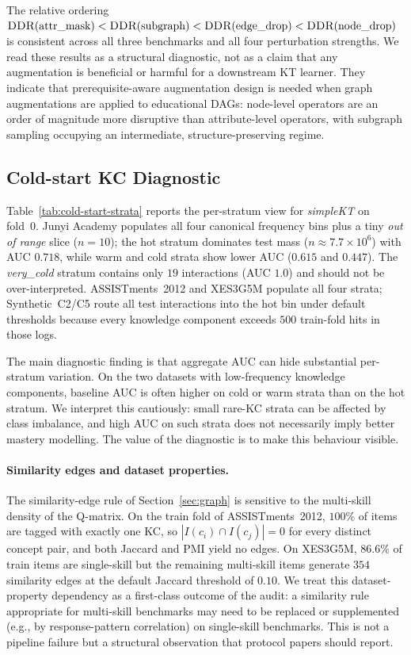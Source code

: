 \documentclass[runningheads]{llncs}
\newcommand{\KC}{knowledge component}
\newcommand{\KCs}{knowledge components}
\newcommand{\DDR}{\textsc{DDR}}
\begin{document}
The relative ordering
$\DDR(\text{attr\_mask}) < \DDR(\text{subgraph}) <
\DDR(\text{edge\_drop}) < \DDR(\text{node\_drop})$
is consistent across all three benchmarks and all four perturbation
strengths. We read these results as a structural diagnostic, not as a
claim that any augmentation is beneficial or harmful for a downstream
KT learner. They indicate that prerequisite-aware augmentation design
is needed when graph augmentations are applied to educational DAGs:
node-level operators are an order of magnitude more disruptive than
attribute-level operators, with subgraph sampling occupying an
intermediate, structure-preserving regime.
\subsection{Cold-start KC Diagnostic}
\label{sec:exp-coldstart}

Table~\ref{tab:cold-start-strata} reports the per-stratum view for
\textit{simpleKT} on fold~0. Junyi Academy populates all four canonical
frequency bins plus a tiny \emph{out of range} slice ($n{=}10$); the
hot stratum dominates test mass ($n{\approx}7.7\times10^6$) with AUC
$0.718$, while warm and cold strata show lower AUC ($0.615$ and
$0.447$). The \emph{very\_cold} stratum contains only $19$ interactions
(AUC $1.0$) and should not be over-interpreted. ASSISTments~2012 and
XES3G5M populate all four strata; Synthetic~C2/C5 route all test
interactions into the hot bin under default thresholds because every
\KC{} exceeds $500$ train-fold hits in those logs.

The main diagnostic finding is that aggregate AUC can hide substantial
per-stratum variation. On the two datasets with low-frequency \KCs{},
baseline AUC is often higher on cold or warm strata than on the hot
stratum. We interpret this cautiously: small rare-KC strata can be
affected by class imbalance, and high AUC on such strata does not
necessarily imply better mastery modelling. The value of the diagnostic
is to make this behaviour visible.

\paragraph{Similarity edges and dataset properties.}
The similarity-edge rule of Section~\ref{sec:graph} is sensitive to the
multi-skill density of the Q-matrix. On the train fold of
ASSISTments~2012, $100\%$ of items are tagged with exactly one KC, so
$|I(c_i) \cap I(c_j)| = 0$ for every distinct concept pair, and both
Jaccard and PMI yield no edges. On XES3G5M, $86.6\%$ of train items are
single-skill but the remaining multi-skill items generate $354$
similarity edges at the default Jaccard threshold of $0.10$. We treat
this dataset-property dependency as a first-class outcome of the audit:
a similarity rule appropriate for multi-skill benchmarks may need to be
replaced or supplemented (e.g., by response-pattern correlation) on
single-skill benchmarks. This is not a pipeline failure but a structural
observation that protocol papers should report.
\end{document}
